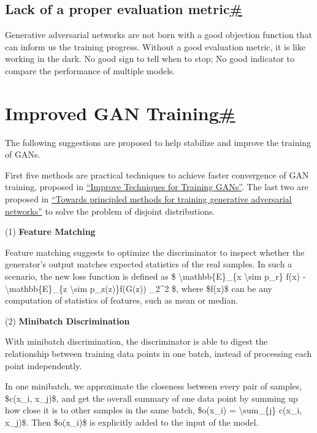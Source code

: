 \subsection{\texorpdfstring{Lack of a proper evaluation metric\hyperref[lack-of-a-proper-evaluation-metric]{\#}}{Lack of a proper evaluation metric\#}}\label{lack-of-a-proper-evaluation-metric}

Generative adversarial networks are not born with a good objection function that can inform us the training progress. Without a good evaluation metric, it is like working in the dark. No good sign to tell when to stop; No good indicator to compare the performance of multiple models.

\section{\texorpdfstring{Improved GAN Training\hyperref[improved-gan-training]{\#}}{Improved GAN Training\#}}\label{improved-gan-training}

The following suggestions are proposed to help stabilize and improve the training of GANs.

First five methods are practical techniques to achieve faster convergence of GAN training, proposed in \href{http://papers.nips.cc/paper/6125-improved-techniques-for-training-gans.pdf}{``Improve Techniques for Training GANs''}. The last two are proposed in \href{https://arxiv.org/pdf/1701.04862.pdf}{``Towards principled methods for training generative adversarial networks''} to solve the problem of disjoint distributions.

(1) \textbf{Feature Matching}

Feature matching suggests to optimize the discriminator to inspect whether the generator's output matches expected statistics of the real samples. In such a scenario, the new loss function is defined as \$\textbar{} \textbackslash mathbb\{E\}\_\{x \textbackslash sim p\_r\} f(x) - \textbackslash mathbb\{E\}\_\{z \textbackslash sim p\_z(z)\}f(G(z)) \textbar\_2\^{}2 \$, where \$f(x)\$ can be any computation of statistics of features, such as mean or median.

(2) \textbf{Minibatch Discrimination}

With minibatch discrimination, the discriminator is able to digest the relationship between training data points in one batch, instead of processing each point independently.

In one minibatch, we approximate the closeness between every pair of samples, \$c(x\_i, x\_j)\$, and get the overall summary of one data point by summing up how close it is to other samples in the same batch, \$o(x\_i) = \textbackslash sum\_\{j\} c(x\_i, x\_j)\$. Then \$o(x\_i)\$ is explicitly added to the input of the model.

